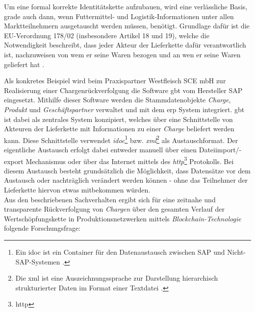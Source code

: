 Um eine formal korrekte Identitätskette aufzubauen, wird eine verlässliche Basis, grade auch dann, wenn Futtermittel- und Logistik-Informationen unter allen Marktteilnehmern ausgetauscht werden müssen, benötigt. Grundlage dafür ist die EU-Verordnung 178/02 (insbesondere Artikel 18 und 19), welche die Notwendigkeit beschreibt, dass jeder Akteur der Lieferkette dafür verantwortlich ist, nachzuweisen von wem er seine Waren bezogen und an wen er seine Waren geliefert hat \citep{EPER2002}.

Als konkretes Beispiel wird beim Praxispartner Westfleisch SCE mbH zur Realisierung einer Chargenrückverfolgung die Software \ac{gbt} vom Hersteller SAP eingesetzt. Mithilfe dieser Software werden die Stammdatenobjekte \textit{Charge}, \textit{Produkt} und \textit{Geschäftspartner} verwaltet und mit dem \ac{erp} System integriert. \ac{gbt} ist dabei als zentrales System konzipiert, welches über eine Schnittstelle von Akteuren der Lieferkette mit Informationen zu einer \textit{Charge} beliefert werden kann. Diese Schnittstelle verwendet \textit{\acs{idoc}}\footnote{Ein \ac{idoc} ist ein Container für den Datenaustausch zwischen SAP und Nicht-SAP-Systemen \citep{SAP2019}.} bzw. \textit{\acs{xml}}\footnote{Die \ac{xml} ist eine Auszeichnungssprache zur Darstellung hierarchisch strukturierter Daten im Format einer Textdatei \citep{Yergeau2008}.} als Austauschformat. Der eigentliche Austausch erfolgt dabei entweder manuell über einen Dateiimport/-export Mechanismus oder über das Internet mittels des \textit{\acs{http}}\footnote{\ac{http}} Protokolls. Bei diesem Austausch besteht grundsätzlich die Möglichkeit, dass Datensätze vor dem Austausch oder nachträglich verändert werden können - ohne das Teilnehmer der Lieferkette hiervon etwas mitbekommen würden.\\

Aus den beschriebenen Sachverhalten ergibt sich für eine zeitnahe und transparente Rückverfolgung von \textit{Chargen} über den gesamten Verlauf der Wertschöpfungskette in Produktionsnetzwerken mittels \textit{Blockchain-Technologie} folgende Forschungsfrage:

